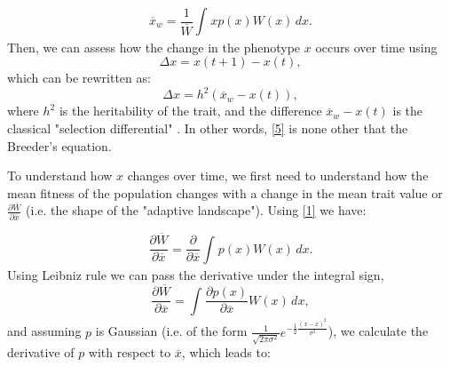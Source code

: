 \documentclass{revtex4}
\begin{document}
\begin{equation}\label{3}
\overline{x}_{w}=\frac{1}{\overline{W}}\int_{} xp(x)W(x)\,dx.
\end{equation}
Then, we can assess how the change in the phenotype $x$ occurs over time using
\begin{equation}\label{4}
\Delta x=x(t+1)-x(t),
\end{equation}
which can be rewritten as:
\begin{equation}\label{5}
\Delta x=h^{2}(\overline{x}_{w}-x(t)),
\end{equation}
where $h^{2}$ is the heritability of the trait, and the difference $\overline{x}_{w}-x(t)$ is the classical "selection differential"  \cite{Falconer:1967tg,Lande:1976ga}. In other words, \ref{5} is none other that the Breeder's equation. 

To understand how $x$ changes over time, we first need to understand how the mean fitness of the population changes with a change in the mean trait value or $\frac{\partial \overline{W}}{\partial \overline{x}}$ (i.e. the shape of the "adaptive landscape"). Using \ref{1} we have:

\begin{equation}\label{6}
\frac{\partial \overline{W}}{\partial \overline{x}}=\frac{\partial}{\partial \overline{x}}\int_{} p(x)W(x)\,dx.
\end{equation}
Using Leibniz rule we can pass the derivative under the integral sign, 
\begin{equation}\label{7}
\frac{\partial \overline{W}}{\partial \overline{x}}=\int_{} \frac{\partial p(x)}{\partial \overline{x}}W(x)\,dx,
\end{equation}
and assuming $p$ is Gaussian (i.e. of the form $\frac{1}{\sqrt{2 \pi \sigma^{2}}} e^{-\frac{1}{2}\frac{(x-\overline{x})^{2}}{\sigma^{2}}} $), we calculate the derivative of $p$ with respect to $\overline{x}$, which leads to:
\end{document}
